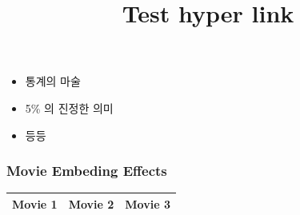 \documentclass{beamer}
\begin{document}
\begin{frame}
\begin{itemize}[<+->]
\item 통계의 마술
\item 5\% 의 진정한 의미
\item 등등
\end{itemize}
\hypertarget<2>{item:second}{}
\end{frame}

\begin{frame}
\title{Test hyper link}
\hyperlink{item:second}{}
\hyperlink{item:second}{}
\hyperlink{item:second}{}
\end{frame}


\begin{frame}
\frametitle{Movie Embeding Effects}
\begin{center}

\begin{tabular}{|c|c|c|} \hline
Movie 1 & Movie 2 & Movie 3 \\ \hline
\end{tabular}
\end{center}

\end{frame}
\end{document}
